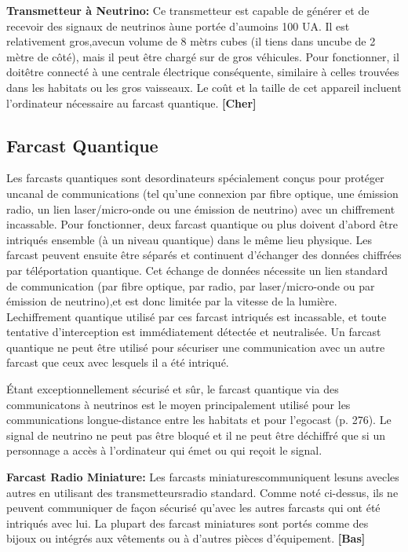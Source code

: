 \textbf{Transmetteur à Neutrino:} Ce transmetteur est capable de générer et de recevoir des signaux de neutrinos àune portée d'aumoins 100 UA. Il est relativement gros,avecun volume de 8 mètrs cubes (il tiens dans uncube de 2 mètre de côté), mais il peut être chargé sur de gros véhicules. Pour fonctionner, il doitêtre connecté à une centrale électrique conséquente, similaire à celles trouvées dans les habitats ou les gros vaisseaux. Le coût et la taille de cet appareil incluent l'ordinateur nécessaire au farcast quantique. \textbf{[Cher]} 

\subsection{Farcast Quantique} \label{sec:quantum-farcasters} 

Les farcasts quantiques sont desordinateurs spécialement conçus pour protéger uncanal de communications (tel qu'une connexion par fibre optique, une émission radio, un lien laser/micro-onde ou une émission de neutrino) avec un chiffrement incassable. Pour fonctionner, deux farcast quantique ou plus doivent d'abord être intriqués ensemble (à un niveau quantique) dans le même lieu physique. Les farcast peuvent ensuite être séparés et continuent d'échanger des données chiffrées par téléportation quantique. Cet échange de données nécessite un lien standard de communication (par fibre optique, par radio, par laser/micro-onde ou par émission de neutrino),et est donc limitée par la vitesse de la lumière. Lechiffrement quantique utilisé par ces farcast intriqués est incassable, et toute tentative d'interception est immédiatement détectée et neutralisée. Un farcast quantique ne peut être utilisé pour sécuriser une communication avec un autre farcast que ceux avec lesquels il a été intriqué. 

Étant exceptionnellement sécurisé et sûr, le farcast quantique via des communicatons à neutrinos est le moyen principalement utilisé pour les communications longue-distance entre les habitats et pour l'egocast (p. 276). Le signal de neutrino ne peut pas être bloqué et il ne peut être déchiffré que si un personnage a accès à l'ordinateur qui émet ou qui reçoit le signal. 

\textbf{Farcast Radio Miniature:} Les farcasts miniaturescommuniquent lesuns avecles autres en utilisant des transmetteursradio standard. Comme noté ci-dessus, ils ne peuvent communiquer de façon sécurisé qu'avec les autres farcasts qui ont été intriqués avec lui. La plupart des farcast miniatures sont portés comme des bijoux ou intégrés aux vêtements ou à d'autres pièces d'équipement.  \textbf{[Bas]} 



